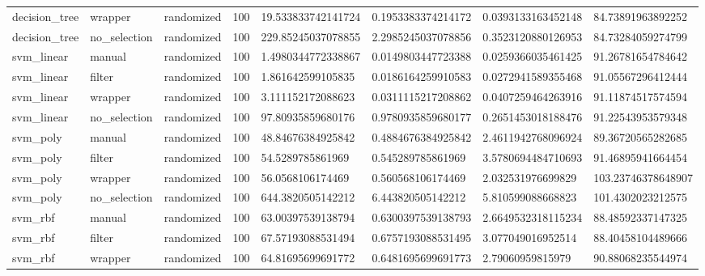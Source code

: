 {\begin{longtable}[c]{@{}llllllll@{}}
	decision\_tree     & wrapper       & randomized & 100 & 19.533833742141724     & 0.1953383374214172     & 0.0393133163452148     & 84.73891963892252  \\
	\rowcolor[HTML]{EFEFEF} 
	decision\_tree     & no\_selection & randomized & 100 & 229.85245037078855     & 2.2985245037078856     & 0.3523120880126953     & 84.73284059274799  \\* \midrule
	svm\_linear        & manual        & randomized & 100 & 1.4980344772338867     & 0.0149803447723388     & 0.0259366035461425     & 91.26781654784642  \\
	\rowcolor[HTML]{EFEFEF} 
	svm\_linear        & filter        & randomized & 100 & 1.861642599105835      & 0.0186164259910583     & 0.0272941589355468     & 91.05567296412444  \\
	svm\_linear        & wrapper       & randomized & 100 & 3.111152172088623      & 0.0311115217208862     & 0.0407259464263916     & 91.11874517574594  \\
	\rowcolor[HTML]{EFEFEF} 
	svm\_linear        & no\_selection & randomized & 100 & 97.80935859680176      & 0.9780935859680177     & 0.2651453018188476     & 91.22543953579348  \\* \midrule
	svm\_poly          & manual        & randomized & 100 & 48.84676384925842      & 0.4884676384925842     & 2.4611942768096924     & 89.36720565282685  \\
	\rowcolor[HTML]{EFEFEF} 
	svm\_poly          & filter        & randomized & 100 & 54.5289785861969       & 0.545289785861969      & 3.5780694484710693     & 91.46895941664454  \\
	svm\_poly          & wrapper       & randomized & 100 & 56.0568106174469       & 0.560568106174469      & 2.032531976699829      & 103.23746378648907 \\
	\rowcolor[HTML]{EFEFEF} 
	svm\_poly          & no\_selection & randomized & 100 & 644.3820505142212      & 6.443820505142212      & 5.810599088668823      & 101.4302023212575  \\* \midrule
	svm\_rbf           & manual        & randomized & 100 & 63.00397539138794      & 0.6300397539138793     & 2.6649532318115234     & 88.48592337147325  \\
	\rowcolor[HTML]{EFEFEF} 
	svm\_rbf           & filter        & randomized & 100 & 67.57193088531494      & 0.6757193088531495     & 3.077049016952514      & 88.40458104489666  \\
	svm\_rbf           & wrapper       & randomized & 100 & 64.81695699691772      & 0.6481695699691773     & 2.79060959815979       & 90.88068235544974  \\

\end{longtable}}

